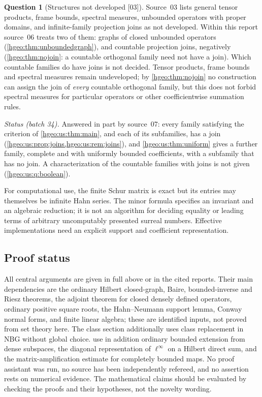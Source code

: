 \documentclass[11pt,letterpaper]{article}
\numberwithin{equation}{section}
\theoremstyle{definition}
\newtheorem{question}[question]{Question}
\theoremstyle{remark}
\newcommand{\src}[1]{\textup{\textsf{\small[#1]}}}
\begin{document}
\begin{question}[Structures not developed \src{03}]\label{hgeo:q:notdeveloped}
Source~03 lists general tensor products, frame bounds, spectral measures,
unbounded operators with proper domains, and infinite-family projection
joins as not developed. Within this report source~06 treats two of them:
graphs of closed unbounded operators (\cref{hgeo:thm:unboundedgraph}), and
countable projection joins, negatively (\cref{hgeo:thm:nojoin}: a countable
orthogonal family need not have a join). Which countable families do have
joins is not decided. Tensor products, frame bounds and spectral measures
remain undeveloped; by \cref{hgeo:thm:nojoin} no construction can assign the
join of \emph{every} countable orthogonal family, but this does not forbid
spectral measures for particular operators or other coefficientwise
summation rules.
\end{question}

\noindent\emph{Status (batch 34).} Answered in part by source~07: every
family satisfying the criterion of \cref{hgeo:us:thm:main}, and each of its
subfamilies, has a join (\cref{hgeo:us:prop:joins,hgeo:us:rem:joins}), and
\cref{hgeo:us:thm:uniform} gives a further family, complete and with uniformly
bounded coefficients, with a subfamily that has no join. A characterization of
the countable families with joins is not given (\cref{hgeo:us:q:boolean}).

For computational use, the finite Schur matrix is exact but its entries may
themselves be infinite Hahn series. The minor formula specifies an invariant
and an algebraic reduction; it is not an algorithm for deciding equality or
leading terms of arbitrary uncomputably presented surreal numbers. Effective
implementations need an explicit support and coefficient representation.

\subsection{Proof status}
All central arguments are given in full above or in the cited reports. Their
main dependencies are the ordinary Hilbert closed-graph, Baire,
bounded-inverse and Riesz theorems, the adjoint theorem for closed densely
defined operators, ordinary positive square roots, the Hahn--Neumann support
lemma, Conway normal forms, and finite linear algebra; these are identified
inputs, not proved from set theory here. The class section additionally uses
class replacement in NBG without global choice.
 use in addition ordinary bounded
extension from dense subspaces, the diagonal representation of
$\ell^\infty$ on a Hilbert direct sum, and the matrix-amplification estimate
for completely bounded maps. No proof assistant was run,
no source has been independently refereed, and no assertion rests on
numerical evidence. The mathematical claims should be evaluated by checking
the proofs and their hypotheses, not the novelty wording.
\end{document}
